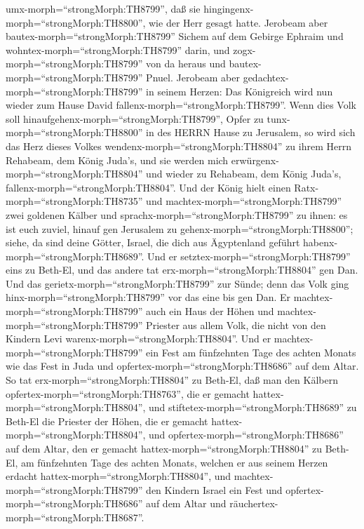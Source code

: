 umx-morph=``strongMorph:TH8799'', daß sie
hingingenx-morph=``strongMorph:TH8800'', wie der Herr gesagt hatte.
 Jerobeam aber bautex-morph=``strongMorph:TH8799'' Sichem
auf dem Gebirge Ephraim und wohntex-morph=``strongMorph:TH8799'' darin,
und zogx-morph=``strongMorph:TH8799'' von da heraus und
bautex-morph=``strongMorph:TH8799'' Pnuel.  Jerobeam aber
gedachtex-morph=``strongMorph:TH8799'' in seinem Herzen: Das Königreich
wird nun wieder zum Hause David fallenx-morph=``strongMorph:TH8799''.
 Wenn dies Volk soll
hinaufgehenx-morph=``strongMorph:TH8799'', Opfer zu
tunx-morph=``strongMorph:TH8800'' in des HERRN Hause zu Jerusalem, so
wird sich das Herz dieses Volkes wendenx-morph=``strongMorph:TH8804'' zu
ihrem Herrn Rehabeam, dem König Juda's, und sie werden mich
erwürgenx-morph=``strongMorph:TH8804'' und wieder zu Rehabeam, dem König
Juda's, fallenx-morph=``strongMorph:TH8804''.  Und der
König hielt einen Ratx-morph=``strongMorph:TH8735'' und
machtex-morph=``strongMorph:TH8799'' zwei goldenen Kälber und
sprachx-morph=``strongMorph:TH8799'' zu ihnen: es ist euch zuviel,
hinauf gen Jerusalem zu gehenx-morph=``strongMorph:TH8800''; siehe, da
sind deine Götter, Israel, die dich aus Ägyptenland geführt
habenx-morph=``strongMorph:TH8689''.  Und er
setztex-morph=``strongMorph:TH8799'' eins zu Beth-El, und das andere tat
erx-morph=``strongMorph:TH8804'' gen Dan.  Und das
gerietx-morph=``strongMorph:TH8799'' zur Sünde; denn das Volk ging
hinx-morph=``strongMorph:TH8799'' vor das eine bis gen Dan.
 Er machtex-morph=``strongMorph:TH8799'' auch ein Haus der
Höhen und machtex-morph=``strongMorph:TH8799'' Priester aus allem Volk,
die nicht von den Kindern Levi warenx-morph=``strongMorph:TH8804''.
 Und er machtex-morph=``strongMorph:TH8799'' ein Fest am
fünfzehnten Tage des achten Monats wie das Fest in Juda und
opfertex-morph=``strongMorph:TH8686'' auf dem Altar. So tat
erx-morph=``strongMorph:TH8804'' zu Beth-El, daß man den Kälbern
opfertex-morph=``strongMorph:TH8763'', die er gemacht
hattex-morph=``strongMorph:TH8804'', und
stiftetex-morph=``strongMorph:TH8689'' zu Beth-El die Priester der
Höhen, die er gemacht hattex-morph=``strongMorph:TH8804'', 
und opfertex-morph=``strongMorph:TH8686'' auf dem Altar, den er gemacht
hattex-morph=``strongMorph:TH8804'' zu Beth-El, am fünfzehnten Tage des
achten Monats, welchen er aus seinem Herzen erdacht
hattex-morph=``strongMorph:TH8804'', und
machtex-morph=``strongMorph:TH8799'' den Kindern Israel ein Fest und
opfertex-morph=``strongMorph:TH8686'' auf dem Altar und
räuchertex-morph=``strongMorph:TH8687''.

